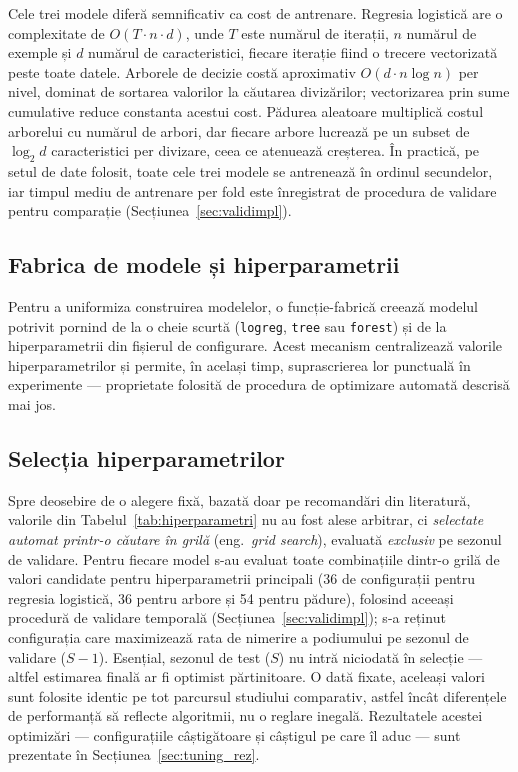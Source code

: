 \documentclass[12pt,a4paper]{report}
\begin{document}
Cele trei modele diferă semnificativ ca cost de antrenare. Regresia logistică are o complexitate de
$O(T \cdot n \cdot d)$, unde $T$ este numărul de iterații, $n$ numărul de exemple și $d$ numărul de
caracteristici, fiecare iterație fiind o trecere vectorizată peste toate datele. Arborele de decizie
costă aproximativ $O(d \cdot n \log n)$ per nivel, dominat de sortarea valorilor la căutarea
divizărilor; vectorizarea prin sume cumulative reduce constanta acestui cost. Pădurea aleatoare
multiplică costul arborelui cu numărul de arbori, dar fiecare arbore lucrează pe un subset de
$\log_2 d$ caracteristici per divizare, ceea ce atenuează creșterea. În practică, pe setul de date
folosit, toate cele trei modele se antrenează în ordinul secundelor, iar timpul mediu de antrenare
per fold este înregistrat de procedura de validare pentru comparație
(Secțiunea~\ref{sec:validimpl}).

\subsection{Fabrica de modele și hiperparametrii}

Pentru a uniformiza construirea modelelor, o funcție-fabrică creează modelul potrivit pornind de la
o cheie scurtă (\texttt{logreg}, \texttt{tree} sau \texttt{forest}) și de la hiperparametrii din
fișierul de configurare. Acest mecanism centralizează valorile hiperparametrilor și permite, în
același timp, suprascrierea lor punctuală în experimente --- proprietate folosită de procedura de
optimizare automată descrisă mai jos.

\subsection{Selecția hiperparametrilor}
\label{sec:tuning}

Spre deosebire de o alegere fixă, bazată doar pe recomandări din literatură, valorile din
Tabelul~\ref{tab:hiperparametri} nu au fost alese arbitrar, ci \emph{selectate automat printr-o
căutare în grilă} (eng.\ \emph{grid search}), evaluată \emph{exclusiv} pe sezonul de validare.
Pentru fiecare model s-au evaluat toate combinațiile dintr-o grilă de valori candidate pentru
hiperparametrii principali (36 de configurații pentru regresia logistică, 36 pentru arbore și 54
pentru pădure), folosind aceeași procedură de validare temporală (Secțiunea~\ref{sec:validimpl});
s-a reținut configurația care maximizează rata de nimerire a podiumului pe sezonul de validare
($S-1$). Esențial, sezonul de test ($S$) nu intră niciodată în selecție --- altfel estimarea finală
ar fi optimist părtinitoare. O dată fixate, aceleași valori sunt folosite identic pe tot parcursul
studiului comparativ, astfel încât diferențele de performanță să reflecte algoritmii, nu o reglare
inegală. Rezultatele acestei optimizări --- configurațiile câștigătoare și câștigul pe care îl
aduc --- sunt prezentate în Secțiunea~\ref{sec:tuning_rez}.
\end{document}
